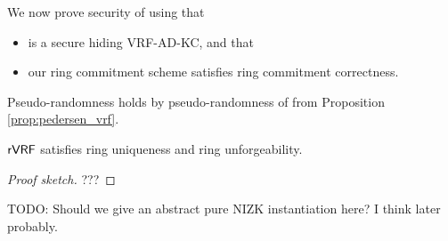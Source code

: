 
We now prove security of \rVRF using that
\begin{itemize}
	\item \PedVRF is a secure hiding VRF-AD-KC, and that
	\item our ring commitment scheme satisfies ring commitment correctness.
\end{itemize}

Pseudo-randomness holds by pseudo-randomness of \PedVRF from
Proposition \ref{prop:pedersen_vrf}.

\begin{proposition}\label{prop:pedersen_rvrf}
	${\mathsf{rVRF}}$ satisfies ring uniqueness and ring unforgeability.
\end{proposition}

\begin{proof}[Proof sketch]
	???
\end{proof}


TODO:  Should we give an abstract pure NIZK instantiation here?  I think later probably.


